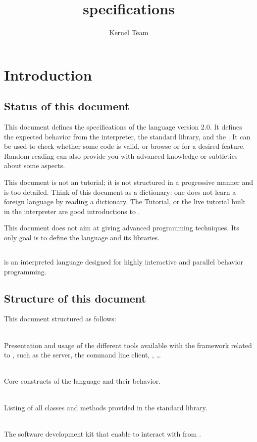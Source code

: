 \documentclass[openright,twoside,11pt]{book}
\title{\us 2.0 specifications}
\author{Kernel Team}
\begin{document}
\maketitle
\tableofcontents

\chapter*{Introduction}

\section*{Status of this document}

This document defines the specifications of the \us language version
2.0. It defines the expected behavior from the \us interpreter, the
standard library, and the \sdk. It can be used to check whether some code
is valid, or browse \us or \Cxx \api for a desired feature. Random reading
can also provide you with
advanced knowledge or subtleties about some \us aspects.

This document is not an \us tutorial; it is not structured in a
progressive manner and is too
detailed. Think of this document as a dictionary: one does not
learn a foreign language by reading a dictionary. The \us Tutorial, or
the live \us tutorial built in the interpreter are good introductions
to \us.

This document does not aim at giving advanced programming
techniques. Its only goal is to define the language and its
libraries.

\section*{\us}

\dfn[urbiscript@\us]{\us} is an interpreted language designed for highly
interactive and parallel behavior programming. %

\section*{Structure of this document}

This document structured as follows:

\begin{description}
  \newcommand{\xitem}[2]{\item[\autoref{#1} --- #2]~\\}
\xitem{sec:tools}{Tools specifications}%
  Presentation and usage of the different tools available with the
  \urbi framework related to \us, such as the \urbi server, the
  command line client, \umake, \ldots

\xitem{sec:lang}{\us language specifications}%
  Core constructs of the language and their behavior.

\xitem{sec:stdlib}{\us standard library specifications}%
  Listing of all classes and methods provided in the standard library.

\xitem{sec:sdk}{\urbi \sdk specifications}%
  The \urbi software development kit that enable to
  interact with \urbi from \Cxx.
\end{description}
\end{document}
